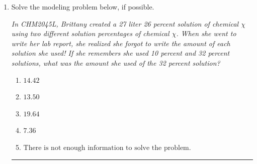 \documentclass[14pt]{extbook}
\newcommand{\litem}[1]{\item#1\hspace*{-1cm}\rule{\textwidth}{0.4pt}}
\begin{document}
\begin{enumerate}
{\begin{enumerate}[label=\Alph*.]
\end{enumerate} }
\litem{
Solve the modeling problem below, if possible.
\begin{center}
    \textit{ In CHM2045L, Brittany created a 27 liter 26 percent solution of chemical $\chi$ using two different solution percentages of chemical $\chi$. When she went to write her lab report, she realized she forgot to write the amount of each solution she used! If she remembers she used 10 percent and 32 percent solutions, what was the amount she used of the 32 percent solution? }
\end{center}
\begin{enumerate}[label=\Alph*.]
\item \( 14.42 \)
\item \( 13.50 \)
\item \( 19.64 \)
\item \( 7.36 \)
\item \( \text{There is not enough information to solve the problem.} \)

\end{enumerate} }
\end{enumerate}
\end{document}
